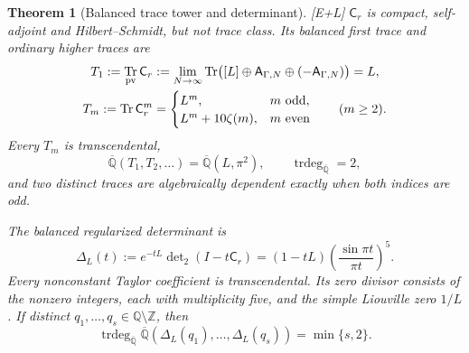 \documentclass[11pt]{article}
\newtheorem{theorem}{Theorem}[section]
\theoremstyle{definition}
\theoremstyle{remark}
\newcommand{\status}[1]{\textnormal{\textcolor{accent}{\footnotesize[#1]}}}
\DeclareMathOperator{\Tr}{Tr}
\begin{document}
\begin{theorem}[Balanced trace tower and determinant]
\label{thm:balanced-Gamma-Liouville}
\status{E+L}
$\mathsf C_r$ is compact, self-adjoint and Hilbert--Schmidt, but not trace class.  Its
balanced first trace and ordinary higher traces are
\begin{equation}\label{eq:balanced-traces}
\begin{aligned}
 T_1:=\Tr_{\rm pv}\mathsf C_r
 &:=\lim_{N\to\infty}
 \Tr\bigl([L]\oplus\mathsf A_{\Gamma,N}\oplus(-\mathsf A_{\Gamma,N})\bigr)=L,\\
 T_m:=\Tr\mathsf C_r^m
 &=\begin{cases}
  L^m,&m\text{ odd},\\
  L^m+10\zeta(m),&m\text{ even}
 \end{cases}
 \qquad(m\ge2).
\end{aligned}
\end{equation}
Every $T_m$ is transcendental,
\[
 \overline{\mathbb Q}(T_1,T_2,\ldots)
 =\overline{\mathbb Q}(L,\pi^2),
 \qquad \operatorname{trdeg}_{\overline{\mathbb Q}}=2,
\]
and two distinct traces are algebraically dependent exactly when both indices are odd.

The balanced regularized determinant is
\begin{equation}\label{eq:balanced-determinant}
 \Delta_L(t):=e^{-tL}\det\nolimits_2(I-t\mathsf C_r)
 =(1-tL)\left(\frac{\sin\pi t}{\pi t}\right)^5.
\end{equation}
Every nonconstant Taylor coefficient is transcendental.  Its zero divisor consists of
the nonzero integers, each with multiplicity five, and the simple Liouville zero $1/L$.
If distinct $q_1,\ldots,q_s\in\mathbb Q\setminus\mathbb Z$, then
\begin{equation}\label{eq:balanced-rational-fibres}
 \operatorname{trdeg}_{\overline{\mathbb Q}}
 \overline{\mathbb Q}(\Delta_L(q_1),\ldots,\Delta_L(q_s))=\min\{s,2\}.
\end{equation}
\end{theorem}
\end{document}
